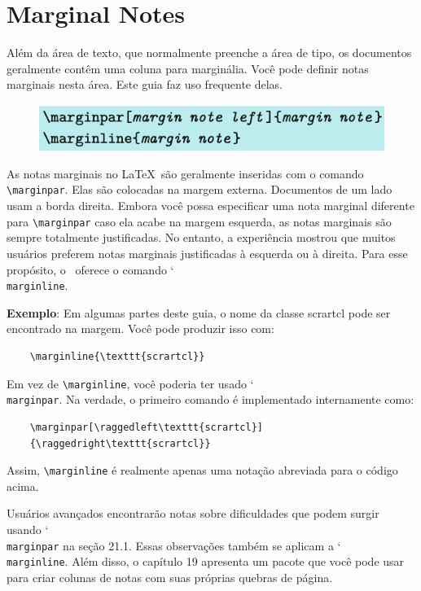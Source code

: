 \chapter{Marginal Notes}
Além da área de texto, que normalmente preenche a área de tipo, os documentos geralmente contêm uma coluna para marginália. Você pode definir notas marginais nesta área. Este guia faz uso frequente delas.

\begin{figure}[h]
    \centering
    \includegraphics[width=0.6\linewidth]{imagens/imagem25.png}
\end{figure}

As notas marginais no \LaTeX\ são geralmente inseridas com o comando \verb|\marginpar|. Elas são colocadas na margem externa. Documentos de um lado usam a borda direita. Embora você possa especificar uma nota marginal diferente para \verb|\marginpar| caso ela acabe na margem esquerda, as notas marginais são sempre totalmente justificadas. No entanto, a experiência mostrou que muitos usuários preferem notas marginais justificadas à esquerda ou à direita. Para esse propósito, o \KOMAScript\ oferece o comando \char`\\\texttt{mar\-gin\-li\-ne}.

\textbf{Exemplo}: Em algumas partes deste guia, o nome da classe scrartcl pode ser encontrado na margem. Você pode produzir isso com:
\begin{verbatim}
    \marginline{\texttt{scrartcl}}   
\end{verbatim}

Em vez de \verb|\marginline|, você poderia ter usado \char`\\\texttt{mar\-gin\-par}. Na verdade, o primeiro comando é implementado internamente como:
\begin{verbatim}
    \marginpar[\raggedleft\texttt{scrartcl}]
    {\raggedright\texttt{scrartcl}}
\end{verbatim}

Assim, \verb|\marginline| é realmente apenas uma notação abreviada para o código acima.

Usuários avançados encontrarão notas sobre dificuldades que podem surgir usando \char`\\\texttt{mar\-gin\-par} na seção 21.1. Essas observações também se aplicam a \char`\\\texttt{mar\-gin\-li\-ne}. Além disso, o capítulo 19 apresenta um pacote que você pode usar para criar colunas de notas com suas próprias quebras de página.
